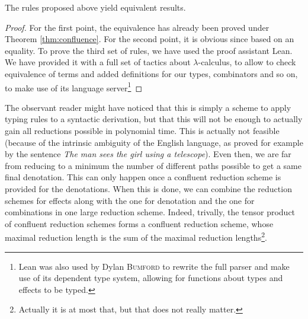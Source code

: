 \begin{thm}
	The rules proposed above yield equivalent results.
\end{thm}
\begin{proof}
	For the first point, the equivalence has already been proved under Theorem
	\ref{thm:confluence}.
	For the second point, it is obvious since based on an equality.
	To prove the third set of rules, we have used the proof assistant Lean.
	We have provided it with a full set of tactics about $\lambda$-calculus,
	to allow to check equivalence of terms and added definitions for our types,
	combinators and so on, to make use of its language server\footnote{Lean was
		also used by Dylan \textsc{Bumford} to rewrite the full parser and make use
		of its dependent type system, allowing for functions about types and
		effects to be typed.}
\end{proof}

\medskip

The observant reader might have noticed that this is simply a scheme to apply
typing rules to a syntactic derivation, but that this will not be enough to
actually gain all reductions possible in polynomial time.
This is actually not feasible (because of the intrinsic ambiguity of the
English language, as proved for example by the sentence \emph{The man sees the
	girl using a telescope}).
Even then, we are far from reducing to a minimum the number of different paths
possible to get a same final denotation.
This can only happen once a confluent reduction scheme is provided for the
denotations.
When this is done, we can combine the reduction schemes for effects along with
the one for denotation and the one for combinations in one large reduction
scheme.
Indeed, trivally, the tensor product of confluent reduction schemes forms a
confluent reduction scheme, whose maximal reduction length is the sum of the
maximal reduction lengths\footnote{Actually it is at most that, but that does
	not	really matter.}.

\medskip

